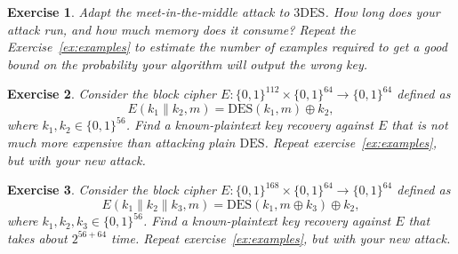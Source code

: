 \documentclass[11pt]{article}
\newtheorem{exercise}{Exercise}
\newcommand{\bits}{\{0,1\}}
\newcommand{\des}{\mathrm{DES}}
\newcommand{\threedes}{\mathrm{3DES}}
\begin{document}
\begin{exercise}
    Adapt the meet-in-the-middle attack to $\threedes$. How long does
    your attack run, and how much memory does it consume? Repeat the
    Exercise~\ref{ex:examples} to estimate the number of examples required
    to get a good bound on the probability your algorithm will output
    the wrong key.
\end{exercise}

\begin{exercise}
    Consider the block cipher $E:\bits^{112}\times\bits^{64}\to\bits^{64}$
    defined as
    \[
        E(k_1\|k_2,m) = \des(k_1,m)\oplus k_2,
    \]
    where $k_1,k_2\in\bits^{56}$. Find a known-plaintext key
    recovery against $E$ that is not much more expensive than attacking
    plain $\des$. Repeat exercise~\ref{ex:examples}, but with your new
    attack.
\end{exercise}

\begin{exercise}
    Consider the block cipher $E:\bits^{168}\times\bits^{64}\to\bits^{64}$
    defined as
    \[
        E(k_1\|k_2\|k_3,m) = \des(k_1,m\oplus k_3)\oplus k_2,
    \]
    where $k_1,k_2,k_3\in\bits^{56}$. Find a known-plaintext key recovery
    against $E$ that takes about $2^{56+64}$ time.  Repeat
    exercise~\ref{ex:examples}, but with your new attack.
\end{exercise}
\end{document}
